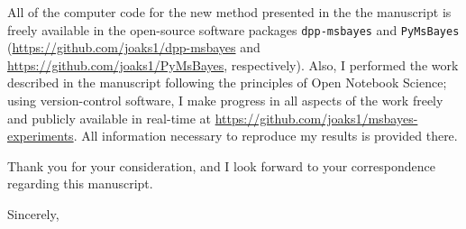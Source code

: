 \documentclass[letterpaper,11pt]{letter}
\begin{document}
\begin{letter}
All of the computer code for the new method presented in the the manuscript is
freely available in the open-source software packages \texttt{dpp-msbayes} and
\texttt{PyMsBayes}
(\href{https://github.com/joaks1/dpp-msbayes}{\url{https://github.com/joaks1/dpp-msbayes}}
and
\href{https://github.com/joaks1/PyMsBayes}{\url{https://github.com/joaks1/PyMsBayes}},
respectively).
Also, I performed the work described in the manuscript following the principles
of Open Notebook Science; using version-control software, I make progress in
all aspects of the work freely and publicly available in real-time at
\href{https://github.com/joaks1/msbayes-experiments}{\url{https://github.com/joaks1/msbayes-experiments}}.
All information necessary to reproduce my results is provided there.

Thank you for your consideration, and I look forward to your correspondence
regarding this manuscript.

\addtolength{\medskipamount}{-6pt}
\closing{Sincerely,}
\end{letter}
\end{document}
